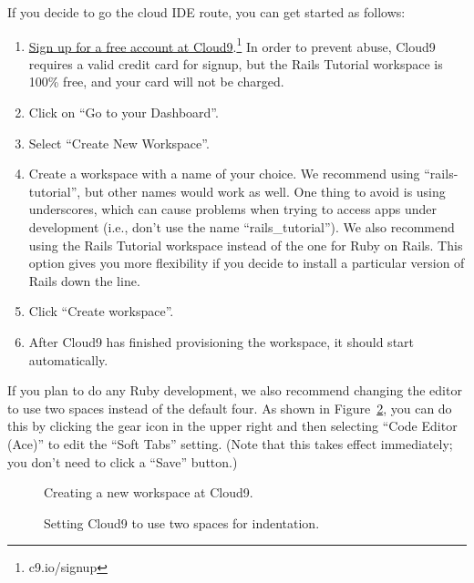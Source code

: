 If you decide to go the cloud IDE route, you can get started as follows:
\begin{enumerate}
\item \href{https://c9.io/web/sign-up/free}{Sign up for a free account at Cloud9}.\footnote{c9.io/signup} In order to prevent abuse, Cloud9 requires a valid credit card for signup, but the Rails Tutorial workspace is 100\% free, and your card will not be charged.
\item Click on ``Go to your Dashboard''.
\item Select ``Create New Workspace''.
\item Create a workspace with a name of your choice. We recommend using ``rails-tutorial'', but other names would work as well. One thing to avoid is using underscores, which can cause problems when trying to access apps under development (i.e., don't use the name ``rails\_tutorial''). We also recommend using the Rails Tutorial workspace instead of the one for Ruby on Rails. This option gives you more flexibility if you decide to install a particular version of Rails down the line.
\item Click ``Create workspace''.
\item After Cloud9 has finished provisioning the workspace, it should start automatically.
\end{enumerate}

If you plan to do any Ruby development, we also recommend changing the editor to use two spaces instead of the default four. As shown in Figure~\ref{fig:cloud9_two_spaces}, you can do this by clicking the gear icon in the upper right and then selecting ``Code Editor (Ace)'' to edit the ``Soft Tabs'' setting. (Note that this takes effect immediately; you don't need to click a ``Save'' button.)

\begin{figure}
\begin{center}
\end{center}
\caption{Creating a new workspace at Cloud9.\label{fig:cloud9_new_workspace}}
\end{figure}

\begin{figure}
\begin{center}
\end{center}
\caption{Setting Cloud9 to use two spaces for indentation.\label{fig:cloud9_two_spaces}}
\end{figure}

